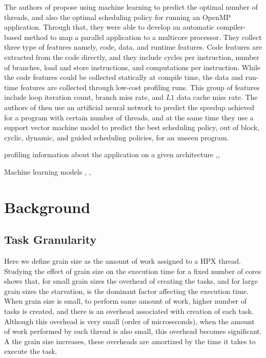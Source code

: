 The authors of \cite{wang2009mapping} propose using machine learning to predict the optimal number of threads, and also the optimal scheduling policy for running an OpenMP application. Through that, they were able to develop an automatic compiler-based method to map a parallel application to a multicore processor. They collect three type of features namely, code, data, and runtime features. Code features are extracted from the code directly, and they include cycles per instruction, number of branches, load and store instructions, and computations per instruction. While the code features could be collected statically at compile time, the data and run-time features are collected through low-cost profiling runs. This group of features include loop iteration count, branch miss rate, and $L1$ data cache miss rate. The authors of \cite{wang2009mapping} then use an artificial neural network to predict the speedup achieved for a program with certain number of threads, and at the same time they use a support vector machine model to predict the best scheduling policy, out of block, cyclic, dynamic, and guided scheduling policies, for an unseen program.



	
	
	
	
\cite{treibig2012performance} 
profiling information about the application on a given architecture
\cite{cammarota2012just},\cite{zhang2005runtime},\cite{thoman2012automatic}

Machine learning models 
\cite{singh2009real}, \cite{zomaya2001observations}, \cite{qawasmeh2015adaptive}



	

	

\cite{li2009machine}

\section{Background}
\subsection{Task Granularity}
Here we define grain size as the amount of work assigned to a HPX thread.
Studying the effect of grain size on the execution time for a fixed number of cores shows that, for small grain sizes the overhead of creating the tasks, and for large grain sizes the starvation, is the dominant factor affecting the execution time. When grain size is small, to perform same amount of work, higher number of tasks is created, and there is an overhead associated with creation of each task. Although this overhead is very small (order of microseconds), when the amount of work performed by each thread is also small, this overhead becomes significant. A the grain size increases, these overheads are amortized by the time it takes to execute the task. 

